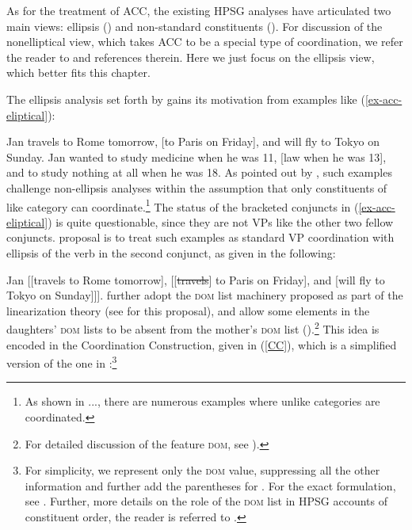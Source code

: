 {%
As for the treatment of ACC, the existing HPSG analyses have articulated two main views: ellipsis
(\citealt{Yatabe2001, Crysmann2003, Beavers2004}) and non-standard constituents (\citealt{Mouret2006}). For discussion of
the nonelliptical view, which takes ACC to be a special type of coordination,
we refer the reader to  and references 
therein. Here we just focus on the ellipsis view, which better fits this chapter.

The ellipsis analysis set forth by \citet{Beavers2004} gains its motivation 
from examples like  (\ref{ex-acc-eliptical}):%

\eal
\label{ex-acc-eliptical}
\ex Jan travels to Rome tomorrow, [to Paris on Friday], and will fly to Tokyo
on Sunday. \label{acc2}
\ex Jan wanted to study medicine when he was 11, [law when he was 13],
and to study nothing at all when he was 18. \label{acc3}\zl
%
As pointed out by \citet{Beavers2004}, such examples challenge non-ellipsis analyses within the assumption that only 
constituents of like category can coordinate.\footnote{As shown in ...,
there are numerous examples where unlike categories are coordinated.}
The status of the bracketed conjuncts in (\ref{ex-acc-eliptical}) is quite questionable, since they are not VPs like the other two fellow conjuncts.  proposal is to treat such examples as standard VP coordination with ellipsis of the verb in the second conjunct, as
given in the following:

\ea
\label{strike-ex}
 Jan [[travels to Rome tomorrow], [[\sout{travels}] to Paris on Friday], and [will fly to Tokyo on Sunday]]].
\z 
%
\citet{Beavers2004} further adopt the \textsc{dom} list
machinery proposed as part of the linearization theory (see  \citealt{Crysmann2003a} for this proposal), and
allow some elements in the daughters' \textsc{dom} lists to be absent from 
the mother's \textsc{dom} list (\citealt{Yatabe2001,Crysmann2003a}).\footnote{For detailed discussion of the feature \textsc{dom}, see ).} 
%
%
This idea is encoded in the Coordination Construction, given in (\ref{CC}), which is a simplified
version of the one in \citep[27]{Beavers2004}:\footnote{For simplicity, we represent only the \textsc{dom} value, suppressing all the other information and further add the parentheses for . 
For the exact formulation, see \citet{Beavers2004}. Further, 
more details on the role of the \textsc{dom} list in HPSG accounts of constituent order, the reader is referred to .}
%

}

